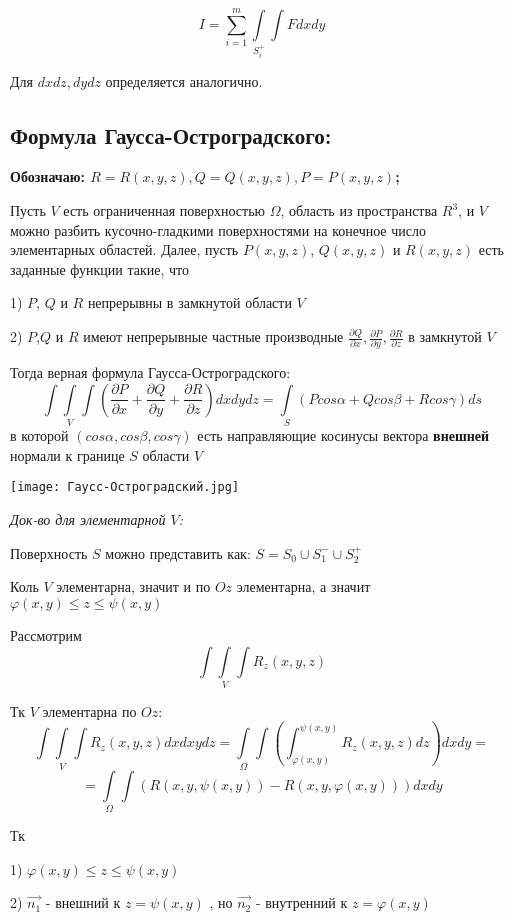 \documentclass[12pt, english]{article}
\begin{document}
$$
I
=
\sum_{i = 1}^{m} \int\limits_{S_i^+}\int F dxdy 
$$

Для $dxdz , dydz$ определяется аналогично. 


\newpage
\subsection{Формула Гаусса-Остроградского:}
\textbf{Обозначаю: $R = R(x, y ,z) , Q = Q(x,y,z) , P = P(x,y,z)$;}

		Пусть $V$ есть ограниченная поверхностью $\Omega$, область из пространства $R^3$, и $V$ можно разбить кусочно-гладкими поверхностями на конечное число элементарных областей. Далее, пусть $P(x, y ,z)$, $Q(x, y ,z)$ и $R(x,y,z)$ есть заданные функции
такие, что 

1)  $P$, $Q$ и $R$ непрерывны в замкнутой области $V$


2) $P$,$Q$ и $R$ имеют непрерывные частные производные $\frac{\partial Q}{\partial x},\frac{\partial P}{\partial y},
\frac{\partial R}{\partial z} $ в замкнутой $V$

Тогда верная формула Гаусса-Остроградского:
$$
\int\int\limits_{V}\int (\frac{\partial P}{\partial x} + \frac{\partial Q}{\partial y} + \frac{\partial R}{\partial z})dxdydz
=
\int\limits_{S} (Pcos\alpha + Qcos\beta + Rcos\gamma)ds
$$
в которой $(cos\alpha, cos\beta, cos\gamma)$ есть направляющие косинусы вектора \textbf{внешней} нормали к границе $S$ области $V$

\texttt{[image: Гаусс-Остроградский.jpg]}

\textit{Док-во для элементарной $V$:}

	Поверхность $S$ можно представить как:
	$S = S_0 \cup S_1^- \cup S_2^+$

	Коль $V$ элементарна, значит и по $Oz$ элементарна, а значит
	$\varphi(x,y) \leq z \leq \psi(x,y)$
	


	Рассмотрим 
	$$\int\int\limits_{V}\int R_z(x,y,z)$$



Тк $V$ элементарна по $Oz$: 
$$
\int\int\limits_{V}\int R_z(x,y,z) dxdxydz
=
\int\limits_{\Omega}\int(\int_{\varphi(x,y)}^{\psi(x,y)} R_z(x,y,z)dz) dxdy
=
$$
$$
=
\int\limits_{\Omega}\int (R(x,y,\psi(x,y)) - R(x,y,\varphi(x,y)))dxdy
$$

Тк 

1)	$\varphi(x,y) \leq z \leq \psi(x,y)$ 

2) $\vec{n_1}$ - внешний к $z = \psi(x,y)$ , но $\vec{n_2}$ - внутренний к $z = \varphi(x,y)$ 
\end{document}

